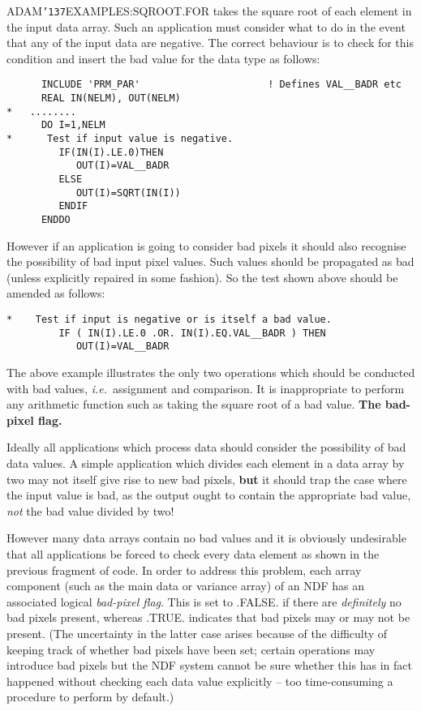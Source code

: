 \documentclass[twoside,11pt]{article}
\renewcommand{\_}{{\tt\char'137}}
\begin{document}
ADAM\_EXAMPLES:SQROOT.FOR takes the square root of each element
in the input data array.
Such an application must consider what to do in the event that any of the 
input data are negative.
The correct behaviour is to check for this condition and insert the 
bad value for the data type as follows:
\begin{verbatim}
      INCLUDE 'PRM_PAR'                      ! Defines VAL__BADR etc
      REAL IN(NELM), OUT(NELM)
*   ........
      DO I=1,NELM
*      Test if input value is negative.
         IF(IN(I).LE.0)THEN
            OUT(I)=VAL__BADR
         ELSE
            OUT(I)=SQRT(IN(I))
         ENDIF
      ENDDO
\end{verbatim}
However if an application is going to consider bad pixels it should also
recognise the possibility of bad input pixel values. Such values should be 
propagated as bad (unless explicitly repaired in some fashion).
So the test shown above should be amended as follows:
\begin{verbatim}
*    Test if input is negative or is itself a bad value.
         IF ( IN(I).LE.0 .OR. IN(I).EQ.VAL__BADR ) THEN
            OUT(I)=VAL__BADR
\end{verbatim}
The above example illustrates the only two operations which should be conducted
with bad values, {\it i.e.}\ assignment and comparison.
It is inappropriate to perform any arithmetic function such as taking
the square root of a bad value.
\newpage
{\large\bf The bad-pixel flag.}

Ideally all applications which process data should consider the possibility of 
bad data values. A simple application which divides each element in 
a data array by two may not 
itself give rise to new bad pixels, {\bf but} it should trap the case where the 
input value is bad, as the output ought to contain the appropriate bad value, 
{\sl not\/} the bad value divided by two!

However many data arrays contain no bad values and it is obviously
undesirable that all applications be forced to check every data 
element as shown in  the previous fragment of code.
In order to address this problem, each array component (such as 
the main data or variance array) of an NDF has an 
associated logical {\sl bad-pixel flag}.
This is set to .FALSE. if there are {\sl definitely\/} no bad pixels present,
whereas .TRUE. indicates that bad pixels may or may not be present.
(The uncertainty in the latter case arises because of the difficulty 
of keeping track of whether bad pixels have been set; 
certain operations  may introduce bad pixels but 
the NDF system cannot be sure whether this has in fact happened without checking
each data value explicitly -- too time-consuming a procedure 
to perform by default.)
\end{document}
